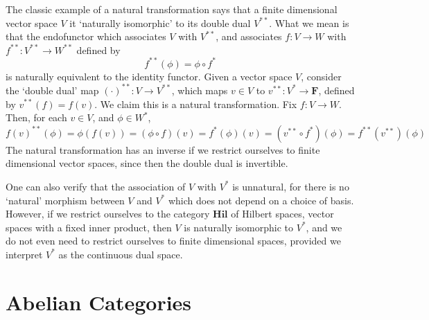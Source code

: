 \begin{example}
    The classic example of a natural transformation says that a finite dimensional vector space $V$ it `naturally isomorphic' to its double dual $V^{**}$. What we mean is that the endofunctor which associates $V$ with $V^{**}$, and associates $f: V \to W$ with $f^{**}: V^{**} \to W^{**}$ defined by
    \[ f^{**}(\phi) = \phi \circ f^* \]
    is naturally equivalent to the identity functor. Given a vector space $V$, consider the `double dual' map $(\cdot)^{**}: V \to V^{**}$, which maps $v \in V$ to $v^{**}: V^* \to \mathbf{F}$, defined by $v^{**}(f) = f(v)$. We claim this is a natural transformation. Fix $f: V \to W$. Then, for each $v \in V$, and $\phi \in W^*$,
    \[ f(v)^{**}(\phi) = \phi(f(v)) = (\phi \circ f)(v) = f^*(\phi)(v) = (v^{**} \circ f^*)(\phi) = f^{**}(v^{**})(\phi) \]
    The natural transformation has an inverse if we restrict ourselves to finite dimensional vector spaces, since then the double dual is invertible.

    One can also verify that the association of $V$ with $V^*$ is unnatural, for there is no `natural' morphism between $V$ and $V^*$ which does not depend on a choice of basis. However, if we restrict ourselves to the category $\mathbf{Hil}$ of Hilbert spaces, vector spaces with a fixed inner product, then $V$ is naturally isomorphic to $V^*$, and we do not even need to restrict ourselves to finite dimensional spaces, provided we interpret $V^*$ as the continuous dual space.
\end{example}



\chapter{Abelian Categories}

